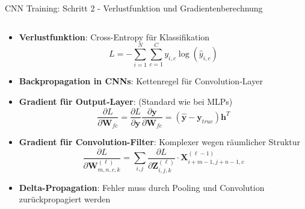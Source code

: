 \documentclass[aspectratio=1610, xcolor=dvipsnames, 9pt]{beamer}
\begin{document}
      \begin{frame}{CNN Training: Schritt 2 - Verlustfunktion und Gradientenberechnung}
        \begin{columns}
          \begin{column}{1\textwidth}
            \begin{itemize}
              \item \textbf{Verlustfunktion}: Cross-Entropy für Klassifikation
              \begin{equation}
                L = -\sum_{i=1}^{N} \sum_{c=1}^{C} y_{i,c} \log(\hat{y}_{i,c})
              \end{equation}
              \item \textbf{Backpropagation in CNNs}: Kettenregel für Convolution-Layer
              \item \textbf{Gradient für Output-Layer}: (Standard wie bei MLPs)
              \begin{equation}
                \frac{\partial L}{\partial \mathbf{W}_{fc}} = \frac{\partial L}{\partial \mathbf{y}} \frac{\partial \mathbf{y}}{\partial \mathbf{W}_{fc}} = (\hat{\mathbf{y}} - \mathbf{y}_{true}) \mathbf{h}^T
              \end{equation}
              \item \textbf{Gradient für Convolution-Filter}: Komplexer wegen räumlicher Struktur
              \begin{equation}
                \frac{\partial L}{\partial \mathbf{W}^{(\ell)}_{m,n,c,k}} = \sum_{i,j} \frac{\partial L}{\partial \mathbf{Z}^{(\ell)}_{i,j,k}} \cdot \mathbf{X}^{(\ell-1)}_{i+m-1,j+n-1,c}
              \end{equation}
              \item \textbf{Delta-Propagation}: Fehler muss durch Pooling und Convolution zurückpropagiert werden
            \end{itemize}
          \end{column}
        \end{columns}
      \end{frame}
\end{document}
